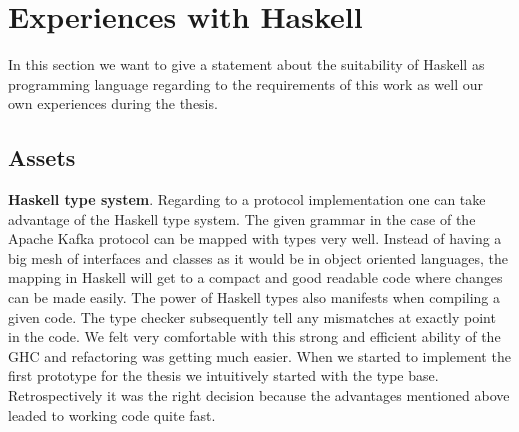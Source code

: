 
\newpage
\section{Experiences with Haskell}
In this section we want to give a statement about the suitability of Haskell
as programming language regarding to the requirements of this work as well 
our own experiences during the thesis. 

\subsection{Assets}
{\bf Haskell type system}. Regarding to a protocol implementation one can take
advantage of the Haskell type system. The given grammar in the case of the
Apache Kafka protocol can be mapped with types very well. Instead of having a
big mesh of interfaces and classes as it would be in object oriented languages,
the mapping in Haskell will get to a compact and good readable code where
changes can be made easily. The power of Haskell types also manifests when
compiling a given code. The type checker subsequently tell any mismatches at
exactly point in the code. We felt very comfortable with this strong and
efficient ability of the GHC and refactoring was getting much easier. When we
started to implement the first prototype for the thesis we intuitively started
with the type base. Retrospectively it was the right decision because the
advantages mentioned above leaded to working code quite fast.

